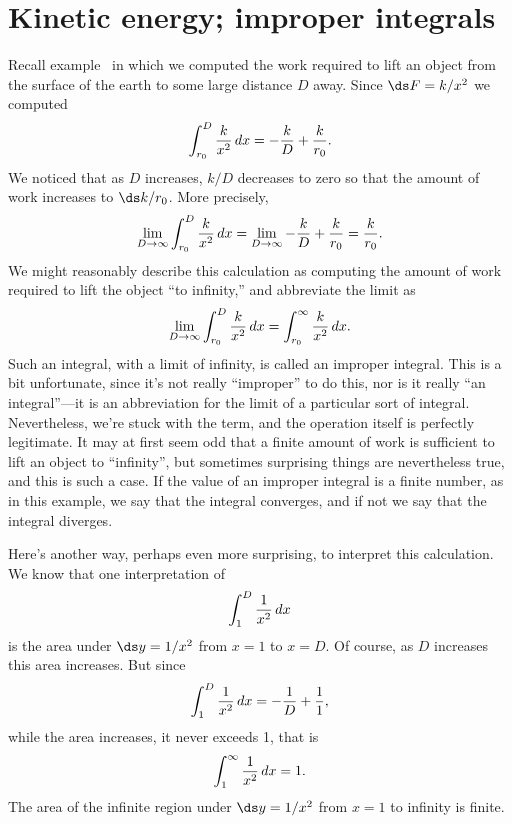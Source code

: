 \section{Kinetic energy; improper integrals}{}{}
\label{sec:improper integrals}
\nobreak
Recall example~ in which we computed
the work required to lift an object from the surface of the earth to
some large distance $D$ away. Since $\ds F=k/x^2$ we computed
$$\int_{r_0}^D {k\over x^2}\,dx=-{k\over D}+{k\over r_0}.$$
We noticed that as $D$ increases, $k/D$ decreases to zero so that the
amount of work increases to $\ds k/r_0$. More precisely,
$$
  \lim_{D\to\infty}\int_{r_0}^D {k\over x^2}\,dx= 
  \lim_{D\to\infty}-{k\over D}+{k\over r_0}={k\over r_0}.
$$
We might reasonably describe this calculation as computing the amount
of work required to lift the object ``to infinity,'' and abbreviate
the limit as
$$
  \lim_{D\to\infty}\int_{r_0}^D {k\over x^2}\,dx= \int_{r_0}^\infty
  {k\over x^2}\,dx.
$$ 
Such an integral, with a limit of infinity, is called an {\dfont
improper integral\/}.
This is a bit unfortunate, since it's not really ``improper'' to do
this, nor is it really ``an integral''---it is an abbreviation for the
limit of a particular sort of integral. Nevertheless, we're stuck with
the term, and the operation itself is perfectly legitimate. It may at
first seem odd that a finite amount of work is sufficient to lift an
object to ``infinity'', but sometimes surprising things are
nevertheless true, and this is such a case. If the value of an
improper integral is a finite number, as in this example, we say that
the integral {\dfont converges},
and if not we say that the integral 
{\dfont diverges}.

Here's another way, perhaps even more surprising, to interpret this
calculation. We know that one interpretation of
$$\int_{1}^D {1\over x^2}\,dx$$
is the area under $\ds y=1/x^2$ from $x=1$ to $x=D$. Of course, as $D$
increases this area increases. But since
$$\int_{1}^D {1\over x^2}\,dx=-{1\over D}+{1\over1},$$
while the area increases, it never exceeds 1, that is
$$\int_{1}^\infty {1\over x^2}\,dx= 1.$$
The area of the infinite region under $\ds y=1/x^2$ from $x=1$ to infinity
is finite.


